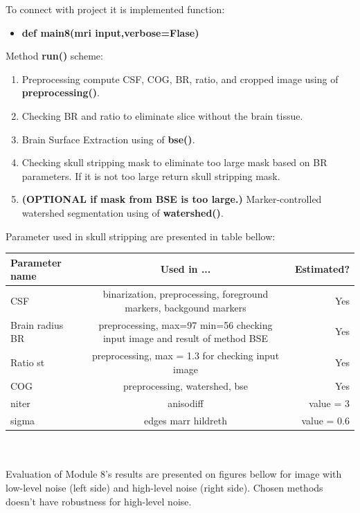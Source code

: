 To connect with project it is implemented function:
\begin{itemize}
    \item {\textbf{def main8(mri input,verbose=Flase)}}
\end{itemize}
Method \textbf{run()} scheme:
\begin{enumerate}
    \item {Preprocessing compute CSF, COG, BR, ratio, and cropped image using of \textbf{preprocessing()}.}
    \item {Checking BR and ratio to eliminate slice without the brain tissue.}
    \item {Brain Surface Extraction using of \textbf{bse()}.}
    \item {Checking skull stripping mask to eliminate too large mask based on BR parameters. If it is not too large return skull stripping mask.}
    \item {\textbf{(OPTIONAL if mask from BSE is too large.)} Marker-controlled watershed segmentation using of \textbf{watershed()}.}
\end{enumerate}
Parameter used in skull stripping are presented in table bellow:\\
\begin{tabular}{ l | c | r }
  \hline
  Parameter name & Used in ... & Estimated?\\
  \hline
  CSF & binarization, preprocessing, foreground markers, backgound markers & Yes\\
  \hline
  Brain radius BR & preprocessing, max=97 min=56 checking input image and result of method BSE & Yes\\
  \hline
  Ratio st & preprocessing, max = 1.3 for checking input image & Yes\\
  \hline
  COG & preprocessing, watershed, bse & Yes\\
  \hline
  niter & anisodiff & value = 3\\
  \hline
  sigma & edges marr hildreth & value = 0.6\\
  \hline
\end{tabular}\\
\\Evaluation of Module 8's results are presented on figures bellow for image with low-level noise (left side) and high-level noise (right side). Chosen methods doesn't have robustness for high-level noise.
